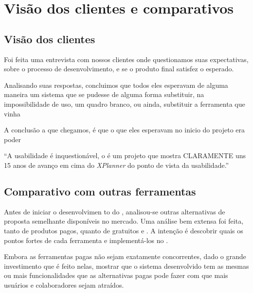 \section{Visão dos clientes e comparativos}

\subsection{Visão dos clientes}

Foi feita uma entrevista com nossos clientes onde questionamos suas expectativas, sobre o processo de desenvolvimento, e se o produto final satisfez o esperado.

Analisando suas respostas, concluimos que todos eles esperavam de alguma maneira um sistema que se pudesse de alguma forma substituir, na impossibilidade de uso, um quadro branco, ou ainda, substituir a ferramenta que vinha 

A conclusão a que chegamos, é que o que eles esperavam no inicio do projeto era poder 

``A usabilidade é inquestionável, o \calopsita{} é um projeto que mostra CLARAMENTE uns 15 anos de avanço em cima do \textit{XPlanner} do ponto de vista da usabilidade.''

\subsection{Comparativo com outras ferramentas}

Antes de iniciar o desenvolvimen	to do \calopsita{}, analisou-se outras alternativas de proposta semelhante disponíveis no mercado. Uma análise bem extensa foi feita, tanto de produtos pagos, quanto de gratuitos e \opensource{}. A intenção é descobrir quais os pontos fortes de cada ferramenta e implementá-los no \calopsita{}. 

Embora as ferramentas pagas não sejam exatamente concorrentes, dado o grande investimento que é feito nelas, mostrar que o sistema desenvolvido tem as mesmas ou mais funcionalidades que as alternativas pagas pode fazer com que mais usuários e colaboradores sejam atraídos.

